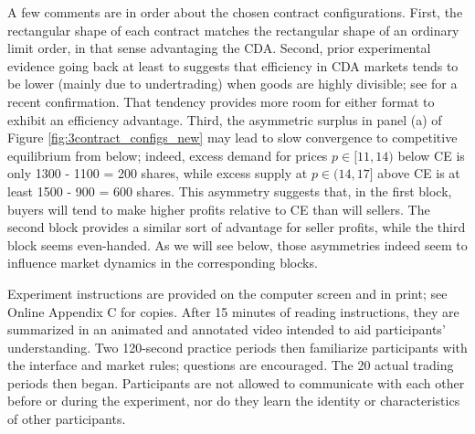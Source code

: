 \documentclass[12pt]{article}
\begin{document}
A few comments are in order about the chosen contract configurations. 
First, the rectangular shape of each contract matches the rectangular shape of an ordinary limit order, in that sense advantaging the CDA. %
Second, prior experimental evidence 
going back at least to \cite{friedman1995competitivity} suggests that efficiency in CDA markets tends to be lower (mainly due to undertrading) when goods are highly divisible; see \cite{angereretal}
for a recent confirmation.
That tendency provides more room for either format to exhibit an efficiency advantage.
Third, the asymmetric surplus in panel (a) of Figure \ref{fig:3contract_configs_new} may lead to slow convergence to competitive equilibrium from below; indeed, excess demand for prices $p \in [11,14)$ below CE is only 1300 - 1100 = 200 shares, while excess supply at $p \in (14, 17]$ above CE is at least 1500 - 900 = 600 shares.
This asymmetry suggests that, in the first block, buyers will tend to make higher profits relative to CE than will sellers.
The second block provides a similar sort of advantage for seller profits, while the third block seems even-handed. As we will see below, those asymmetries indeed seem to influence market dynamics in the corresponding blocks. 


Experiment instructions are provided on the computer screen and in print; see Online Appendix C for copies. %
After 15 minutes of reading instructions, they are summarized in an animated and annotated video intended to aid participants' understanding. 
Two 120-second practice periods then familiarize participants with the interface and market rules; questions
are encouraged. 
The 20 actual trading periods then began.
Participants are not allowed to communicate with each other before or during the experiment, nor do they learn the identity or characteristics of other participants.
\end{document}
